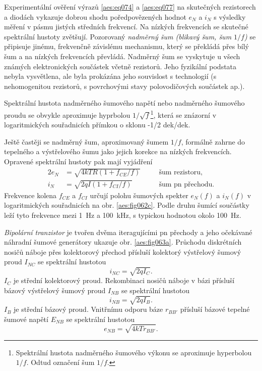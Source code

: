         Experimentální ověření výrazů \ref{aes:eq074} a \ref{aes:eq077} na skutečných rezistorech a
        diodách vykazuje dobrou shodu poředpovězených hodnot \(e_N\) a \(i_N\) s výsledky měření v
        pásmu jistých středních frekvencí. Na nízkých frekvencích se skutečné spektrální hustoty
        zvětšují. Pozorovaný \emph{nadměrný šum (blikavý šum, šum \(1/f\))} se připisuje jinému,
        frekvenčně závislému mechanismu, který se překládá přes bílý šum a na nízkých frekvencích
        převládá. Nadměrný šum se vyskytuje u všech známých elektronických součástek včetně
        rezistorů. Jeho fyzikální podstata nebyla vysvětlena, ale byla prokázána jeho souvislost s
        technologií (s nehomogenitou rezistorů, s povrchovými stavy polovodičových součástek ap.).

        Spektrální hustota nadměrného šumového napětí nebo nadměrného šumového proudu se obvykle
        aproximuje hyprbolou \(1/\sqrt{f}\)\footnote{Spektrální hustota nadměrného šumového výkonu
        se aproximuje hyperbolou \(1/f\). Odtud označení šum \(1/f\).}, která se znázorní v
        logaritmických souřadnicích přímkou o sklonu -1/2 dek/dek. 

        Ještě častěji se nadměrný šum, aproximovaný šumem \(1/f\), formálně zahrne do tepelného a
        výstřelového šumu jako jejich korekce na nízkých frekvencích. Opravené spektrální hustoty
        pak mají vyjádření 
        \begin{alignat}{2}
          e_N &= \sqrt{4kTR(1 + f_{CE}/f)} &&\quad\text{šum rezistoru},   \label{aes:eq078a}   \\
          i_N &= \sqrt{2qI(1 + f_{CI}/f)}  &&\quad\text{šum pn přechodu}. \label{aes:eq078b}
        \end{alignat}
        Frekvence kolena \(f_{CE}\) a \(f_{CI}\) určují polohu šumových spekter \(e_N(f)\) a
        \(i_N(f)\) v logaritmických souřadnicích na obr. \ref{aes:fig062c}. Podle druhu šumící
        součástky leží tyto frekvence mezi \SI{1}{\Hz} a \SI{100}{\kHz}, s typickou hodnotou okolo
        \SI{100}{\Hz}.

        \emph{Bipolární tranzistor} je tvořen dvěma iteragujícími pn přechody a jeho očekávané
        náhradní šumové generátory ukazuje obr. \ref{aes:fig063a}. Průchodu diskrétních nosičů
        náboje přes kolektorový přechod přísluší kolektorý výstřelový šumový proud \(I_{NC}\) se
        spektrální hustotou
        \begin{equation}\label{aes:eq079}
          i_{NC} = \sqrt{2qI_C}.
        \end{equation} 
        \(I_C\) je střední kolektorový proud. Rekombinaci nosičů náboje v bázi přísluší bázový
        výstřelový šumový proud \(I_{NB}\) se spektrální hustotou 
        \begin{equation}\label{aes:eq080}
          i_{NB} = \sqrt{2qI_B}.
        \end{equation} 
        \(I_B\) je střední bázový proud. Vnitřnímu odporu báze \(r_{BB'}\) přísluší bázové tepelné
        šumové napětí \(E_{NB}\) se spektrální hustotou
        \begin{equation}\label{aes:eq081}
          e_{NB} = \sqrt{4kTr_{BB'}}.
        \end{equation} 


